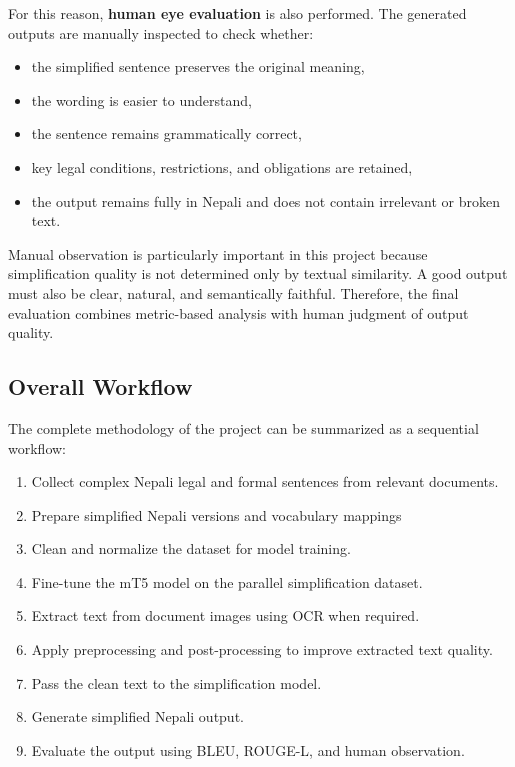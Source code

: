 \documentclass[12pt]{report}
\begin{document}
For this reason, \textbf{human eye evaluation} is also performed. The generated outputs are manually inspected to check whether:

\begin{itemize}
    \item the simplified sentence preserves the original meaning,
    \item the wording is easier to understand,
    \item the sentence remains grammatically correct,
    \item key legal conditions, restrictions, and obligations are retained,
    \item the output remains fully in Nepali and does not contain irrelevant or broken text.
\end{itemize}

Manual observation is particularly important in this project because simplification quality is not determined only by textual similarity. A good output must also be clear, natural, and semantically faithful. Therefore, the final evaluation combines metric-based analysis with human judgment of output quality.

\subsection{Overall Workflow}

The complete methodology of the project can be summarized as a sequential workflow:

\begin{enumerate}
    \item Collect complex Nepali legal and formal sentences from relevant documents.
    \item Prepare simplified Nepali versions and vocabulary mappings
    \item Clean and normalize the dataset for model training.
    \item Fine-tune the mT5 model on the parallel simplification dataset.
    \item Extract text from document images using OCR when required.
    \item Apply preprocessing and post-processing to improve extracted text quality.
    \item Pass the clean text to the simplification model.
    \item Generate simplified Nepali output.
    \item Evaluate the output using BLEU, ROUGE-L, and human observation.
\end{enumerate}
\end{document}
